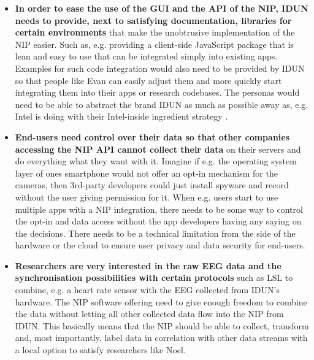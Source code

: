 \begin{itemize}
  \item \textbf{In order to ease the use of the GUI and the API of the NIP, IDUN needs to provide, next to satisfying documentation, libraries for certain environments} that make the unobtrusive implementation of the NIP easier. Such as, e.g. providing a client-side JavaScript package that is lean and easy to use that can be integrated simply into existing apps. Examples for such code integration would also need to be provided by IDUN so that people like Evan can easily adjust them and more quickly start integrating them into their apps or research codebases. The personas would need to be able to abstract the brand IDUN as much as possible away as, e.g. Intel is doing with their Intel-inside ingredient strategy \citep{intel_ingredient_nodate}.
  \item \textbf{End-users need control over their data so that other companies accessing the NIP API cannot collect their data} on their servers and do everything what they want with it. Imagine if e.g. the operating system layer of ones smartphone would not offer an opt-in mechanism for the cameras, then 3rd-party developers could just install spyware and record without the user giving permission for it. When e.g. users start to use multiple apps with a NIP integration, there needs to be some way to control the opt-in and data access without the app developers having any saying on the decisions. There needs to be a technical limitation from the side of the hardware or the cloud to ensure user privacy and data security for end-users.
  \item \textbf{Researchers are very interested in the raw EEG data and the synchronisation possibilities with certain protocols} such as LSL to combine, e.g. a heart rate sensor with the EEG collected from IDUN's hardware. The NIP software offering need to give enough freedom to combine the data without letting all other collected data flow into the NIP from IDUN. This basically means that the NIP should be able to collect, transform and, most importantly, label data in correlation with other data streams with a local option to satisfy researchers like Noel.
\end{itemize}

